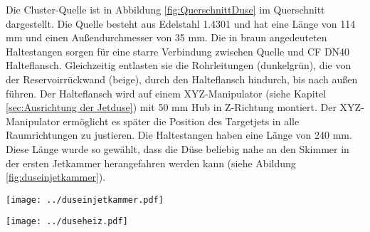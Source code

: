 Die Cluster-Quelle ist in Abbildung \ref{fig:QuerschnittDuse} im Querschnitt dargestellt. Die Quelle besteht aus Edelstahl 1.4301 und hat eine Länge von 114 mm und einen Außendurchmesser von 35 mm. Die in braun angedeuteten Haltestangen sorgen für eine starre Verbindung zwischen Quelle und CF DN40 Halteflansch. Gleichzeitig entlasten sie die Rohrleitungen (dunkelgrün), die von der Reservoirrückwand (beige), durch den Halteflansch hindurch, bis nach außen führen. Der Halteflansch wird auf einem XYZ-Manipulator (siehe Kapitel \ref{sec:Ausrichtung der Jetduse}) mit 50 mm Hub in Z-Richtung montiert. Der XYZ-Manipulator ermöglicht es später die Position des Targetjets in alle Raumrichtungen zu justieren. Die Haltestangen haben eine Länge von 240 mm. Diese Länge wurde so gewählt, dass die Düse beliebig nahe an den Skimmer in der ersten Jetkammer herangefahren werden kann (siehe Abildung \ref{fig:duseinjetkammer}).

\begin{center}
\begin{minipage}{\linewidth}
\centering
\texttt{[image: ../duseinjetkammer.pdf]}%
\label{fig:duseinjetkammer}
\end{minipage} 
\end{center} 
 

\begin{center}
\begin{minipage}{\linewidth}
\centering
\texttt{[image: ../duseheiz.pdf]}%
\label{fig:duseheiz}
\end{minipage} 
\end{center} 
  
